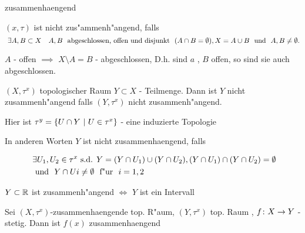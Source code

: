 \documentclass[class=article, crop=false]{standalone}
\begin{document}
\begin{zettel}{zusammenhaengend}
\begin{flashcard}[]{}
	\begin{definition}
		$(x,\tau)$ ist nicht zus"ammenh"angend, falls
		\[
			\exists  A,B \subset X \quad A,B  \tx{ abgeschlossen, offen und disjunkt } (A \cap B =  \emptyset), X =  A \cup B \tx{ und } A,B \neq \emptyset
		.\]
		\begin{remark}
			$A$ - offen $\implies $ $X \setminus A =  B$ - abgeschlossen, D.h. sind $a$ , $B$ offen, so sind sie auch abgeschlossen.
		\end{remark}
	\end{definition}
\end{flashcard}
\begin{definition}
	$(X,\tau^x)$ topologischer Raum $Y \subset X$ - Teilmenge. Dann ist $Y$ nicht zusammenh"angend falls $ (Y,\tau^x)$ nicht zusammenh"angend.

	Hier ist $\tau^y =  \set{U \cap Y}{U \in  \tau^x}$ - eine induzierte Topologie

	In anderen Worten $Y$ ist nicht zusammenhaengend, falls

	\begin{align*}
		 & \exists U_1 , U_2 \in  \tau^x \text{ s.d. } Y = ( Y \cap U_1 ) \cup ( Y \cap U_2), ( Y \cap U_1 ) \cap ( Y \cap U_2) = \emptyset \\
		 & \tx{ und } Y \cap Ui \neq  \emptyset \tx{ f"ur } i = 1,2
	\end{align*}
\end{definition}
\end{zettel}

\begin{lemma}
	$Y \subset \mathbb{R} $ ist zusammenh"angend $\iff $ $Y$ ist ein Intervall
\end{lemma}

\begin{theorem}
	Sei $(X,\tau^x)$-zusammenhaengende top. R"aum, $ (Y,\tau^x)$ top. Raum , $f \colon X\to Y $ - stetig. Dann ist $f(x)$ zusammenhaengend
\end{theorem}
\end{document}
